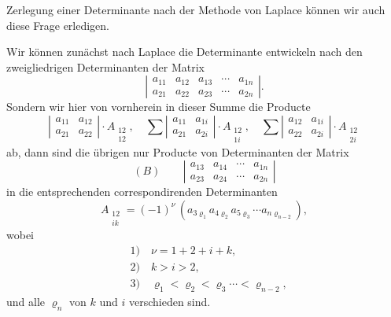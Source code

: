 \documentclass[11pt]{article}
\begin{document}
Zerlegung einer Determinante nach der Methode von Laplace können wir auch diese Frage erledigen.

Wir können zunächst nach Laplace die Determinante entwickeln nach den zweigliedrigen Determinanten der Matrix
\[
\left|\begin{array}{ccccc}
a_{11} & a_{12} & a_{13} & \cdots & a_{1n}\\
a_{21} & a_{22} & a_{23} & \cdots & a_{2n}
\end{array}\right|.
\]
Sondern wir hier von vornherein in dieser Summe die Producte
\[
\left|\begin{array}{cc} a_{11} & a_{12}\\ a_{21} & a_{22}\end{array}\right|\cdot A_{\substack{12\\12}},\quad
\sum\left|\begin{array}{cc} a_{11} & a_{1i}\\ a_{21} & a_{2i}\end{array}\right|\cdot A_{\substack{12\\1i}},\quad
\sum\left|\begin{array}{cc} a_{12} & a_{1i}\\ a_{22} & a_{2i}\end{array}\right|\cdot A_{\substack{12\\2i}}
\]
ab, dann sind die übrigen nur Producte von Determinanten der Matrix
\[
(B)\qquad \left|\begin{array}{cccc} a_{13} & a_{14} & \cdots & a_{1n}\\ a_{23} & a_{24} & \cdots & a_{2n}\end{array}\right|
\]
in die entsprechenden correspondirenden Determinanten
\[
A_{\substack{12\\ik}} = (-1)^{\nu}\,(a_{3\varrho_1} a_{4\varrho_2} a_{5\varrho_3} \cdots a_{n\varrho_{n-2}}),
\]
wobei
\[
\begin{aligned}
&\text{1)}\quad \nu = 1+2+i+k,\\
&\text{2)}\quad k>i>2,\\
&\text{3)}\quad \varrho_1<\varrho_2<\varrho_3\cdots<\varrho_{n-2},
\end{aligned}
\]
und alle $\varrho_n$ von $k$ und $i$ verschieden sind.
\end{document}
